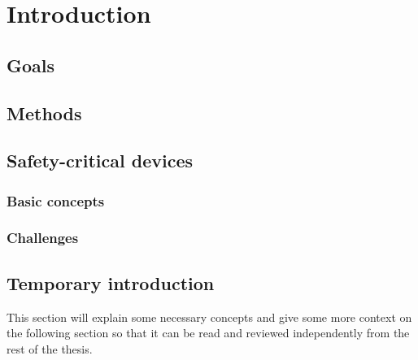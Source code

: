 
\chapter{Introduction} %

\label{Chapter1} %


\newcommand{\keyword}[1]{\textbf{#1}}
\newcommand{\tabhead}[1]{\textbf{#1}}
\newcommand{\code}[1]{\texttt{#1}}
\newcommand{\file}[1]{\texttt{\bfseries#1}}
\newcommand{\option}[1]{\texttt{\itshape#1}}


\section{Goals}



\section{Methods}



\section{Safety-critical devices}
\subsection{Basic concepts}
\subsection{Challenges}


\section{Temporary introduction}
This section will explain some necessary concepts and give some more context on the following section so that it can be read and reviewed independently from the rest of the thesis.

